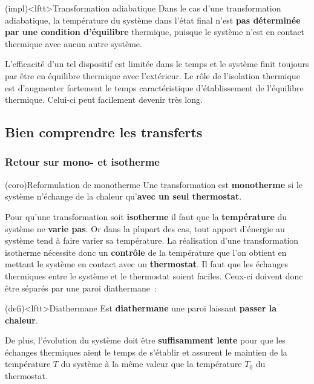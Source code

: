 \documentclass[../../main/main.tex]{subfiles}
\begin{document}
\begin{tcb}(impl)<lftt>{Transformation adiabatique}
	Dans le cas d'une transformation adiabatique, la température du système dans
	l'état final n'est \textbf{pas déterminée par une condition d'équilibre}
	thermique, puisque le système n'est en contact thermique avec aucun autre
	système.
\end{tcb}

L'efficacité d'un tel dispositif est limitée dans le temps et le système finit
toujours par être en équilibre thermique avec l'extérieur. Le rôle de
l'isolation thermique est d'augmenter fortement le temps caractéristique
d'établissement de l'équilibre thermique. Celui-ci peut facilement devenir
très long.

\subsection{Bien comprendre les transferts}
\subsubsection{Retour sur mono- et isotherme}

\begin{tcb*}(coro){Reformulation de monotherme}
	Une transformation est \textbf{monotherme} si le système n'échange de la
	chaleur qu'\textbf{avec un seul thermostat}.
\end{tcb*}

Pour qu'une transformation soit \textbf{isotherme} il faut que la
\textbf{température} du système ne \textbf{varie pas}. Or dans la plupart des
cas, tout
apport d'énergie au système tend à faire varier sa température.
\bigbreak
La réalisation d'une transformation isotherme nécessite donc un
\textbf{contrôle} de la température que l'on obtient en mettant le système en
contact avec un \textbf{thermostat}. Il faut que les échanges thermiques entre
le système et le thermostat soient faciles. Ceux-ci doivent donc être séparés
par une paroi diathermane~:
\begin{tcb}(defi)<lftt>{Diathermane}
	Est \textbf{diathermane} une paroi laissant \textbf{passer la chaleur}.
\end{tcb}
De plus, l'évolution du système doit être \textbf{suffisamment lente} pour que
les échanges thermiques aient le temps de s'établir et assurent le maintien de
la température $T$ du système à la même valeur que la température $T_0$ du
thermostat.
\end{document}
